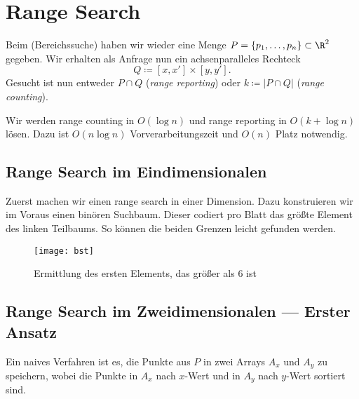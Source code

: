 \section{Range Search}

Beim  (Bereichssuche) haben wir wieder eine Menge \( P = \left \{ p_1, \dots, p_n \right \} \subset \R^2 \) gegeben. Wir erhalten als Anfrage nun ein achsenparalleles Rechteck
\begin{equation*}
  Q \coloneqq [x,x'] \times [y,y']\text{.}
\end{equation*}
Gesucht ist nun entweder \( P \cap Q \) (\emph{range reporting}) oder \( k \coloneqq \left\vert P \cap Q \right\vert \) (\emph{range counting}).

Wir werden range counting in \( O(\log n) \) und range reporting in \( O(k+\log n) \) lösen. Dazu ist \( O(n\log n) \) Vorverarbeitungszeit und \( O(n) \) Platz notwendig.

\subsection{Range Search im Eindimensionalen}

\begin{minipage}{.55\textwidth}
  Zuerst machen wir einen range search in einer Dimension. Dazu konstruieren wir im Voraus einen binören Suchbaum. Dieser codiert pro Blatt das größte Element des linken Teilbaums. So können die beiden Grenzen leicht gefunden werden.
  \vspace*{1em}
\end{minipage}
\hfill
\begin{minipage}{.3\textwidth}
  \begin{figure}[H]
    \texttt{[image: bst]}
    \caption{Ermittlung des ersten Elements, das größer als \( 6 \) ist}
  \end{figure}
  \vspace*{1em}
\end{minipage}

\subsection{Range Search im Zweidimensionalen --- Erster Ansatz}

Ein naives Verfahren ist es, die Punkte aus \( P \) in zwei Arrays \( A_x \) und \( A_y \) zu speichern, wobei die Punkte in \( A_x \) nach \( x \)-Wert und in \( A_y \) nach \( y \)-Wert sortiert sind.

